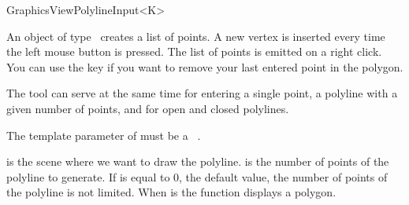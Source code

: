 
\begin{ccRefClass}{GraphicsViewPolylineInput<K>}

\ccDefinition
An object of type \ccRefName\ creates a list of points. A new 
vertex is inserted every time the left mouse button is pressed.
The list of points is emitted on a right click. You can use the 
key if you want to remove your last entered point in the polygon.

The tool can serve at the same time for entering a single point,
a polyline with a given number of points, and for open and closed
polylines.


\ccParameters

The template parameter of  must be a \cgal\ . 

\ccInheritsFrom
{}

\ccGlue

\ccCreation
{}

{ is the scene where we want to draw the polyline.  is the
  number of points of the polyline to generate. If  is equal to 0,
  the default value, the number of points of the polyline is not
  limited. When  is  the function displays a
  polygon.}

\end{ccRefClass}







